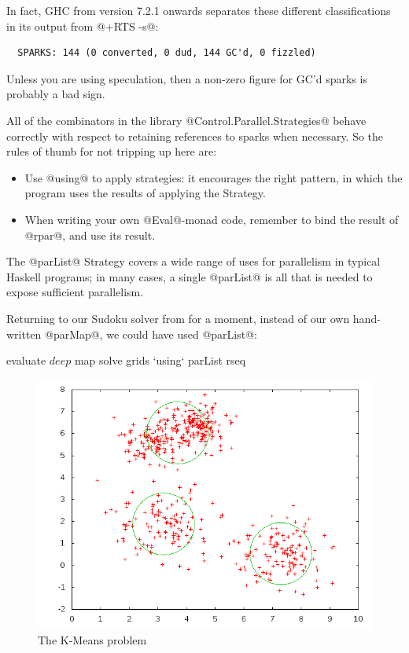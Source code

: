 In fact, GHC from version 7.2.1 onwards separates these different
classifications in its output from @+RTS -s@:

{\small \begin{verbatim}
  SPARKS: 144 (0 converted, 0 dud, 144 GC'd, 0 fizzled)
\end{verbatim}}

\noindent Unless you are using speculation, then a non-zero figure for
GC'd sparks is probably a bad sign.

All of the combinators in the library @Control.Parallel.Strategies@
behave correctly with respect to retaining references to sparks when
necessary.  So the rules of thumb for not tripping up here are:

\begin{itemize}
\item Use @using@ to apply strategies: it encourages the right
  pattern, in which the program uses the results of applying the
  Strategy.
\item When writing your own @Eval@-monad code, remember to bind the
  result of @rpar@, and use its result.
\end{itemize}


The @parList@ Strategy covers a wide range of uses for parallelism in
typical Haskell programs; in many cases, a single @parList@ is all
that is needed to expose sufficient parallelism.

Returning to our Sudoku solver from  for a moment,
instead of our own hand-written @parMap@, we could have used
@parList@:

\begin{haskell}
    evaluate $ deep $ map solve grids `using` parList rseq
\end{haskell}

\begin{figure}
\begin{center}
\includegraphics[scale=0.6]{kmeans-example.png}
\end{center}
\caption{The K-Means problem}
\label{fig:kmeans-example}
\end{figure}

